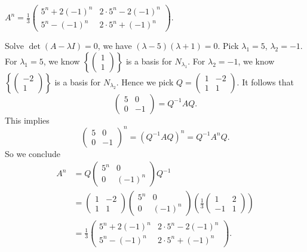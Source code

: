 \begin{Exercise}
\begin{answer}
$A^n = \frac{1}{3}\begin{pmatrix}
5^n+2(-1)^n & 2\cdot 5^n - 2(-1)^n \\
5^n-(-1)^n & 2\cdot 5^n + (-1)^n
\end{pmatrix}$.
\end{answer}
\begin{solution}
Solve $\det(A-\lambda I) = 0$, we have $(\lambda-5)(\lambda+1) = 0$. Pick $\lambda_1 = 5$, $\lambda_2 = -1$. For $\lambda_1 = 5$, we know $\left\{\begin{pmatrix}
1 \\
1
\end{pmatrix}\right\}$ is a basis for $N_{\lambda_1}$. For $\lambda_2 = -1$, we know $\left\{\begin{pmatrix}
-2 \\
1
\end{pmatrix}\right\}$ is a basis for $N_{\lambda_2}$. Hence we pick $Q = \begin{pmatrix}
1 & -2 \\
1 & 1
\end{pmatrix}$. It follows that
$$
\begin{pmatrix}
5 & 0 \\
0 & -1
\end{pmatrix} = Q^{-1} A Q.
$$
This implies
$$
\begin{pmatrix}
5 & 0 \\
0 & -1
\end{pmatrix}^n = (Q^{-1} A Q)^n = Q^{-1} A^n Q.
$$
So we conclude
\begin{align*}
A^n 
&= Q \begin{pmatrix}
5^n & 0 \\
0 & (-1)^n
\end{pmatrix} Q^{-1} \\ 
&= \begin{pmatrix}
1 & -2 \\
1 & 1
\end{pmatrix} \begin{pmatrix}
5^n & 0 \\
0 & (-1)^n
\end{pmatrix} \left( \frac{1}{3}\begin{pmatrix}
1 & 2 \\
-1 & 1
\end{pmatrix} \right) \\
&= \frac{1}{3}\begin{pmatrix}
5^n+2(-1)^n & 2\cdot 5^n - 2(-1)^n \\
5^n-(-1)^n & 2\cdot 5^n + (-1)^n
\end{pmatrix}.
\end{align*}
\end{solution}
\end{Exercise}